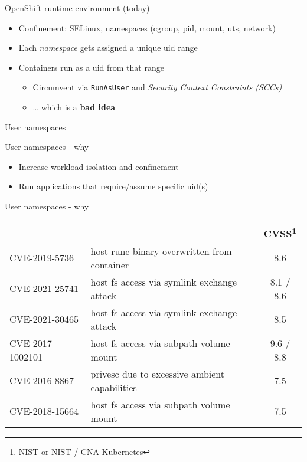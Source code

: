 \documentclass[ignorenonframetext,aspectratio=169,12pt]{beamer}
\begin{document}
\begin{frame}{OpenShift runtime environment (today)}
\protect\hypertarget{openshift-runtime-today}{}
\begin{itemize}
\item Confinement: SELinux, namespaces (cgroup, pid, mount, uts, network)
\item Each {\em namespace} gets assigned a unique uid range
\item Containers run as a uid from that range
    \begin{itemize}
      \item Circumvent via {\tt RunAsUser} and {\em Security Context
        Constraints (SCCs)}
      \item \dots{} which is a {\bf bad idea}
    \end{itemize}
\end{itemize}
\end{frame}


\begin{frame}[plain]
\centering
\huge User namespaces
\end{frame}

\begin{frame}{User namespaces - why}
\protect\hypertarget{userns-why}{}
\begin{itemize}
\item Increase workload isolation and confinement
\item Run applications that require/assume specific uid(s)
\end{itemize}
\end{frame}

\begin{frame}{User namespaces - why}
\protect\hypertarget{userns-why-cves}{}
  \centering
  \small
  \def\arraystretch{1.5}
  \begin{tabular}{|l|p{}|c|}
    \centering {\bf CVE}   & \centering {\bf description}       & {\bf CVSS}\footnote{NIST or NIST / CNA Kubernetes} \\
    \hline
    CVE-2019-5736    & host runc binary overwritten from container & 8.6 \\
    CVE-2021-25741   & host fs access via symlink exchange attack & 8.1 / 8.6 \\
    CVE-2021-30465   & host fs access via symlink exchange attack & 8.5 \\
    CVE-2017-1002101 & host fs access via subpath volume mount & 9.6 / 8.8 \\
    CVE-2016-8867    & privesc due to excessive ambient capabilities & 7.5 \\
    CVE-2018-15664   & host fs access via subpath volume mount & 7.5 \\
  \end{tabular}
\end{frame}
\end{document}
